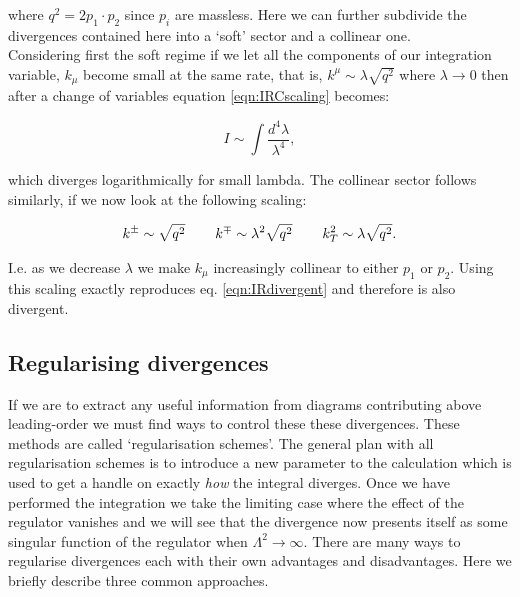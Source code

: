 		where $q^2=2p_1\cdot p_2$ since $p_i$ are massless.  Here we can further subdivide the divergences
		contained here into a `soft' sector and a collinear one.\\Considering first the soft regime if we
		let all the components of our integration variable, $k_\mu$ become small at the same rate, that is,
		$k^\mu\sim\lambda\sqrt{q^2}$ where $\lambda\rightarrow0$ then after a change of variables equation
		\eqref{eqn:IRCscaling} becomes:

		\begin{equation}
			I \sim\int\frac{d^4\lambda}{\lambda^4},
			\label{eqn:IRdivergent}
		\end{equation}

		which diverges logarithmically for small lambda.  The collinear sector follows similarly, if we now
		look at the following scaling:

		\begin{align}
			k^\pm\sim\sqrt{q^2}\hspace{0.75cm}k^\mp\sim\lambda^2\sqrt{q^2}\hspace{0.75cm}k_T^2\sim\lambda\sqrt{q^2}.
		\end{align}

		I.e. as we decrease $\lambda$ we make $k_\mu$ increasingly collinear to either $p_1$ or $p_2$.  Using
		this scaling exactly reproduces eq. \eqref{eqn:IRdivergent} and therefore is also divergent.

	\subsection{Regularising divergences}
		\label{sub:regularising}


		If we are to extract any useful information from diagrams contributing above leading-order we must find
		ways to control these these divergences.  These methods are called `regularisation schemes'.  The
		general plan with all regularisation schemes is to introduce a new parameter to the calculation which
		is used to get a handle on exactly \emph{how} the integral diverges.  Once we have performed the integration
		we take the limiting case where the effect of the regulator vanishes and we will see that the divergence now
		presents itself as some singular function of the regulator when $\Lambda^2\rightarrow\infty$.  There are
		many ways to regularise divergences each with their own advantages and disadvantages.  Here we briefly describe
		three common approaches.

